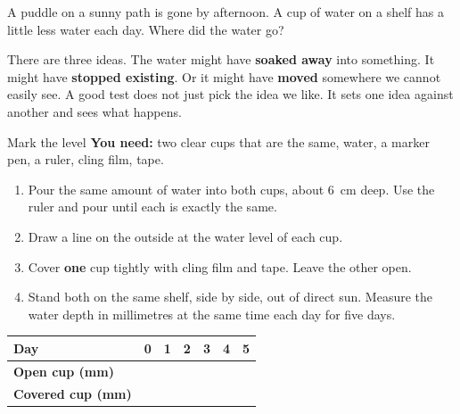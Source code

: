 \label{ch1}

A puddle on a sunny path is gone by afternoon. A cup of water on a shelf has a little less water each day. Where did the water go?

There are three ideas. The water might have \textbf{soaked away} into something. It might have \textbf{stopped existing}. Or it might have \textbf{moved} somewhere we cannot easily see. A good test does not just pick the idea we like. It sets one idea against another and sees what happens.

\begin{center}
\end{center}

\begin{tryit}{Mark the level}
\textbf{You need:} two clear cups that are the same, water, a marker pen, a ruler, cling film, tape.
\begin{enumerate}[leftmargin=1.6em]
\item Pour the same amount of water into both cups, about 6~cm deep. Use the ruler and pour until each is exactly the same.
\item Draw a line on the outside at the water level of each cup.
\item Cover \textbf{one} cup tightly with cling film and tape. Leave the other open.
\item Stand both on the same shelf, side by side, out of direct sun. Measure the water depth in millimetres at the same time each day for five days.
\end{enumerate}
\par\medskip
\renewcommand{\arraystretch}{1.6}
\begin{tabular}{|l|c|c|c|c|c|c|}
\hline
\textbf{Day} & 0 & 1 & 2 & 3 & 4 & 5\\ \hline
\textbf{Open cup (mm)} & & & & & & \\ \hline
\textbf{Covered cup (mm)} & & & & & & \\ \hline
\end{tabular}
\end{tryit}

